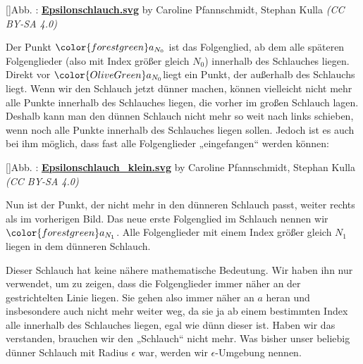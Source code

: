 \documentclass[fontsize=9pt,
               parskip=half-,
               DIV=14,
               listof=chapterentry,
               tocflat]{scrbook}
\newcounter{imagelabel}
\begin{document}
[]{Abb. : \protect\href{https://commons.wikimedia.org/wiki/File:Epsilonschlauch.svg}{\textbf{Epsilonschlauch.svg}} by Caroline Pfannschmidt, Stephan Kulla \textit{(CC BY-SA 4.0)}}\begin{center}
\end{center}

Der Punkt ${\color {forestgreen}a_{N_{0}}}$ ist das Folgenglied, ab dem alle späteren Folgenglieder (also mit Index größer gleich $N_{0}$) innerhalb des Schlauches liegen. Direkt vor $\color {OliveGreen}a_{N_{0}}$liegt ein Punkt, der außerhalb des Schlauchs liegt. Wenn wir den Schlauch jetzt dünner machen, können vielleicht nicht mehr alle Punkte innerhalb des Schlauches liegen, die vorher im großen Schlauch lagen. Deshalb kann man den dünnen Schlauch nicht mehr so weit nach links schieben, wenn noch alle Punkte innerhalb des Schlauches liegen sollen. Jedoch ist es auch bei ihm möglich, dass fast alle Folgenglieder „eingefangen“ werden können:

[]{Abb. : \protect\href{https://commons.wikimedia.org/wiki/File:Epsilonschlauch_klein.svg}{\textbf{Epsilonschlauch\allowbreak\_klein.svg}} by Caroline Pfannschmidt, Stephan Kulla \textit{(CC BY-SA 4.0)}}\begin{center}
\end{center}

Nun ist der Punkt, der nicht mehr in den dünneren Schlauch passt, weiter rechts als im vorherigen Bild. Das neue erste Folgenglied im Schlauch nennen wir ${\color {forestgreen}a_{N_{1}}}$. Alle Folgenglieder mit einem Index größer gleich $N_{1}$ liegen in dem dünneren Schlauch.

Dieser Schlauch hat keine nähere mathematische Bedeutung. Wir haben ihn nur verwendet, um zu zeigen, dass die Folgenglieder immer näher an der gestrichtelten Linie liegen. Sie gehen also immer näher an $a$ heran und insbesondere auch nicht mehr weiter weg, da sie ja ab einem bestimmten Index alle innerhalb des Schlauches liegen, egal wie dünn dieser ist. Haben wir das verstanden, brauchen wir den „Schlauch“ nicht mehr. Was bisher unser beliebig dünner Schlauch mit Radius $\epsilon $ war, werden wir $\epsilon $-Umgebung nennen.
\end{document}
